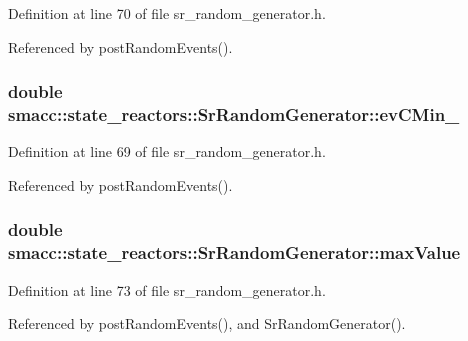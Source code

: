 Definition at line 70 of file sr\+\_\+random\+\_\+generator.\+h.



Referenced by post\+Random\+Events().

\subsubsection[{\texorpdfstring{ev\+C\+Min\+\_\+}{evCMin_}}]{\setlength{\rightskip}{0pt plus 5cm}double smacc\+::state\+\_\+reactors\+::\+Sr\+Random\+Generator\+::ev\+C\+Min\+\_\+\hspace{0.3cm}{\ttfamily [private]}}\hypertarget{classsmacc_1_1state__reactors_1_1SrRandomGenerator_a048ec99a9978b1d51b8ecb96be4800c8}{}\label{classsmacc_1_1state__reactors_1_1SrRandomGenerator_a048ec99a9978b1d51b8ecb96be4800c8}


Definition at line 69 of file sr\+\_\+random\+\_\+generator.\+h.



Referenced by post\+Random\+Events().

\subsubsection[{\texorpdfstring{max\+Value}{maxValue}}]{\setlength{\rightskip}{0pt plus 5cm}double smacc\+::state\+\_\+reactors\+::\+Sr\+Random\+Generator\+::max\+Value\hspace{0.3cm}{\ttfamily [private]}}\hypertarget{classsmacc_1_1state__reactors_1_1SrRandomGenerator_a693a1e627efe396dbb4f2849ce14d85d}{}\label{classsmacc_1_1state__reactors_1_1SrRandomGenerator_a693a1e627efe396dbb4f2849ce14d85d}


Definition at line 73 of file sr\+\_\+random\+\_\+generator.\+h.



Referenced by post\+Random\+Events(), and Sr\+Random\+Generator().

